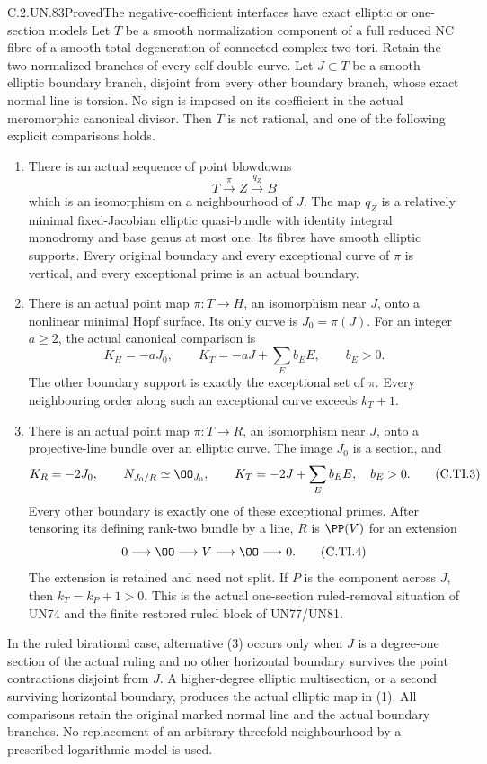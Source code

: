 \begin{statement}{C.2.UN.83}{Proved}{The negative-coefficient interfaces have exact elliptic or one-section models}
Let \(T\) be a smooth normalization component of a full
reduced NC fibre of a smooth-total degeneration of connected
complex two-tori. Retain the two normalized branches of
every self-double curve. Let \(J\subset T\) be a smooth
elliptic boundary branch, disjoint from every other boundary
branch, whose exact normal line is torsion. No sign is
imposed on its coefficient in the actual meromorphic
canonical divisor. Then \(T\) is not rational, and one
of the following explicit comparisons holds.

\begin{enumerate}
\item There is an actual sequence of point blowdowns
\[
 T\xrightarrow{\pi}Z\xrightarrow{q_Z}B
 \tag{C.TI.1}
\]
which is an isomorphism on a neighbourhood of \(J\).
The map \(q_Z\) is a relatively minimal fixed-Jacobian
elliptic quasi-bundle with identity integral monodromy
and base genus at most one. Its fibres have smooth
elliptic supports. Every original boundary and every
exceptional curve of \(\pi\) is vertical, and every
exceptional prime is an actual boundary.

\item There is an actual point map \(\pi:T\to H\),
an isomorphism near \(J\), onto a nonlinear minimal
Hopf surface. Its only curve is \(J_0=\pi(J)\).
For an integer \(a\ge2\), the actual canonical
comparison is
\[
 K_H=-aJ_0,\qquad
 K_T=-aJ+\sum_E b_EE,\qquad b_E>0.
 \tag{C.TI.2}
\]
The other boundary support is exactly the exceptional
set of \(\pi\). Every neighbouring order along such
an exceptional curve exceeds \(k_T+1\).

\item There is an actual point map \(\pi:T\to R\),
an isomorphism near \(J\), onto a projective-line
bundle over an elliptic curve. The image \(J_0\)
is a section, and
\[
 K_R=-2J_0,\qquad N_{J_0/R}\simeq\OO_{J_0},\qquad
 K_T=-2J+\sum_E b_EE,\quad b_E>0.
 \tag{C.TI.3}
\]
Every other boundary is exactly one of these
exceptional primes. After tensoring its defining
rank-two bundle by a line, \(R\) is
\(\PP(V)\) for an extension
\[
              0\longrightarrow\OO\longrightarrow V
                    \longrightarrow\OO\longrightarrow0.
 \tag{C.TI.4}
\]
The extension is retained and need not split.
If \(P\) is the component across \(J\), then
\(k_T=k_P+1>0\). This is the actual one-section
ruled-removal situation of UN74 and the finite
restored ruled block of UN77/UN81.
\end{enumerate}

In the ruled birational case, alternative (3) occurs
only when \(J\) is a degree-one section of the actual
ruling and no other horizontal boundary survives the
point contractions disjoint from \(J\). A higher-degree
elliptic multisection, or a second surviving horizontal
boundary, produces the actual elliptic map in (1).
All comparisons retain the original marked normal line
and the actual boundary branches. No replacement of an
arbitrary threefold neighbourhood by a prescribed
logarithmic model is used.
\end{statement}

